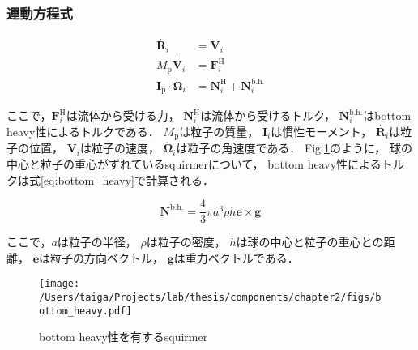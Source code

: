 \subsubsection{運動方程式}
\label{sec:equation_of_motion}
    \begin{align}
        \dot{\boldsymbol{R}_i} &= \boldsymbol{V}_i \\
        M_\mathrm{p} \dot{\boldsymbol{V}_i} &= \boldsymbol{F}^\mathrm{H}_i \\
        \boldsymbol{I}_\mathrm{p} \cdot \dot{\boldsymbol{\Omega}_i} &=
            \boldsymbol{N}^\mathrm{H}_i + \boldsymbol{N}^\mathrm{b.h.}_i
    \end{align}

ここで，$\boldsymbol{F}^\mathrm{H}_i$は流体から受ける力，
$\boldsymbol{N}^\mathrm{H}_i$は流体から受けるトルク，
$\boldsymbol{N}^\mathrm{b.h.}_i$はbottom heavy性によるトルクである．
$M_\mathrm{p}$は粒子の質量，
$\boldsymbol{I}_i$は慣性モーメント，
$\dot{\boldsymbol{R}_i}$は粒子の位置，
$\boldsymbol{V}_i$は粒子の速度，
$\dot{\boldsymbol{\Omega}_i}$は粒子の角速度である．
Fig.\ref{fig:bottom_heavy_fig}のように，
球の中心と粒子の重心がずれているsquirmerについて，
bottom heavy性によるトルクは式\eqref{eq:bottom_heavy}で計算される．

    \begin{equation}
        \boldsymbol{N}^\mathrm{b.h.} = \frac{4}{3} \pi a^3 \rho h \boldsymbol{e} \times \boldsymbol{g}
        \label{eq:bottom_heavy}
    \end{equation}

\noindent
ここで，$a$は粒子の半径，
$\rho$は粒子の密度，
$h$は球の中心と粒子の重心との距離，
$\boldsymbol{e}$は粒子の方向ベクトル，
$\boldsymbol{g}$は重力ベクトルである．

    \begin{figure}[htbp]
        \centering
        \texttt{[image: /Users/taiga/Projects/lab/thesis/components/chapter2/figs/bottom\_heavy.pdf]}
        \caption{bottom heavy性を有するsquirmer}
        \label{fig:bottom_heavy_fig}
    \end{figure}
